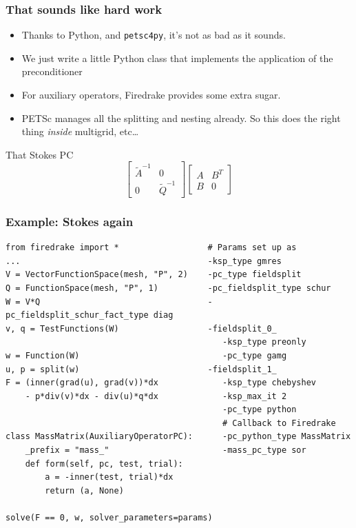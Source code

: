 \documentclass[presentation,aspectratio=43, 10pt]{beamer}
\begin{document}
\begin{frame}[fragile]
  \frametitle{That sounds like hard work}

  \begin{itemize}
  \item Thanks to Python, and \texttt{petsc4py}, it's not as bad as
    it sounds.
  \item We just write a little Python class that implements the
    application of the preconditioner
  \item For auxiliary operators, Firedrake provides some extra
    sugar.
  \item PETSc manages all the splitting and nesting already. So this
    does the right thing \emph{inside} multigrid, etc\ldots
  \end{itemize}
  \begin{block}{That Stokes PC}
    \begin{equation*}
      \begin{bmatrix}
        \tilde{A}^{-1} & 0 \\
        0 & \tilde{Q}^{-1}
      \end{bmatrix}
      \begin{bmatrix}
        A & B^T \\
        B & 0
      \end{bmatrix}
    \end{equation*}
  \end{block}
\end{frame}

\begin{frame}[fragile]
  \frametitle{Example: Stokes again}
\begin{verbatim}
from firedrake import *                  # Params set up as
...                                      -ksp_type gmres
V = VectorFunctionSpace(mesh, "P", 2)    -pc_type fieldsplit
Q = FunctionSpace(mesh, "P", 1)          -pc_fieldsplit_type schur
W = V*Q                                  -pc_fieldsplit_schur_fact_type diag
v, q = TestFunctions(W)                  -fieldsplit_0_
                                            -ksp_type preonly
w = Function(W)                             -pc_type gamg
u, p = split(w)                          -fieldsplit_1_
F = (inner(grad(u), grad(v))*dx             -ksp_type chebyshev
    - p*div(v)*dx - div(u)*q*dx             -ksp_max_it 2
                                            -pc_type python
                                            # Callback to Firedrake
class MassMatrix(AuxiliaryOperatorPC):      -pc_python_type MassMatrix
    _prefix = "mass_"                       -mass_pc_type sor
    def form(self, pc, test, trial):
        a = -inner(test, trial)*dx
        return (a, None)

solve(F == 0, w, solver_parameters=params)
\end{verbatim}
\end{frame}
\end{document}

